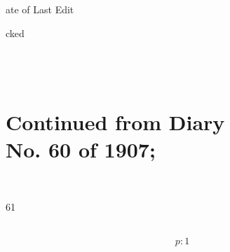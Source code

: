 \documentclass{report}
\begin{document}
	\par{
 	ate of Last Edit\ \\
	}

	\par{
 	cked\ \\\ \\\ \\\ \\
	}

	\chapter{Continued from Diary\ \\No. 60 of 1907;\ \\}

	\par{
 	\ \\
	}

	\par{
 	61\ \\
	}

	\par{
 	\ \\
  \[p: 1 \]

	}
\end{document}
